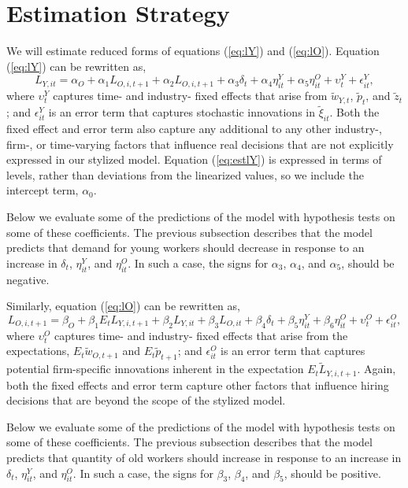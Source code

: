 \documentclass[11pt]{article}
\newcommand{\beq}{\begin{equation}}
\newcommand{\eeq}{\end{equation}}
\begin{document}
\section{Estimation Strategy}

We will estimate reduced forms of equations (\ref{eq:lY}) and  (\ref{eq:lO}). Equation (\ref{eq:lY}) can be rewritten as,
\beq \label{eq:estlY} L_{Y,it} = \alpha_O + \alpha_1 L_{O,i,t+1} + \alpha_2 L_{O,i,t+1} + \alpha_{3} \delta_{t} + \alpha_4 \eta_{it}^Y + \alpha_5 \eta_{it}^O + \upsilon^Y_{t} + \epsilon^Y_{it}, \eeq
where $\upsilon^Y_{t}$ captures time- and industry- fixed effects that arise from $\tilde{w}_{Y,t}$, $\tilde{p}_{t}$, and $\tilde{z}_t$; and $\epsilon^Y_{it}$ is an error term that captures stochastic innovations in $\tilde{\xi}_{it}$.  Both the fixed effect and error term also capture any additional to any other industry-, firm-, or time-varying factors that influence real decisions that are not explicitly expressed in our stylized model. Equation (\ref{eq:estlY}) is expressed in terms of levels, rather than deviations from the linearized values, so we include the intercept term, $\alpha_0$.

Below we evaluate some of the predictions of the model with hypothesis tests on some of these coefficients. The previous subsection describes that the model predicts that demand for young workers should decrease in response to an increase in $\delta_t$, $\eta_{it}^Y$, and $\eta_{it}^O$.  In such a case, the signs for $\alpha_3$, $\alpha_4$, and $\alpha_5$, should be negative.

Similarly, equation (\ref{eq:lO}) can be rewritten as,
\beq \label{eq:estlY} L_{O,i,t+1} = \beta_O + \beta_1 E_t L_{Y,i,t+1} + \beta_2 L_{Y,it} + \beta_{3} L_{O,it} + \beta_{4} \delta_{t} + \beta_5 \eta_{it}^Y + \beta_6 \eta_{it}^O + \upsilon^O_{t} + \epsilon^O_{it}, \eeq
where $\upsilon^O_{t}$ captures time- and industry- fixed effects that arise from the expectations,  $E_t \tilde{w}_{O,t+1}$ and  $E_t \tilde{p}_{t+1}$; and $\epsilon^O_{it}$ is an error term that captures potential firm-specific innovations inherent in the expectation $E_t \tilde{L}_{Y,i,t+1}$. Again, both the fixed effects and error term capture other factors that influence hiring decisions that are beyond the scope of the stylized model.

Below we evaluate some of the predictions of the model with hypothesis tests on some of these coefficients. The previous subsection describes that the model predicts that quantity of old workers should increase in response to an increase in $\delta_t$, $\eta_{it}^Y$, and $\eta_{it}^O$.  In such a case, the signs for $\beta_3$, $\beta_4$, and $\beta_5$, should be positive.
\end{document}
